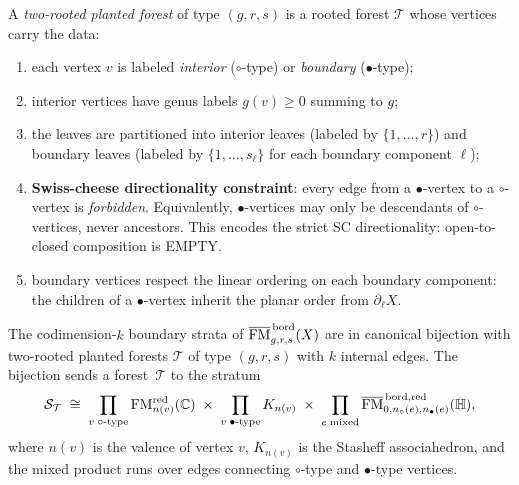 \begin{definition}
\label{def:two-rooted-forest}
A \emph{two-rooted planted forest} of type $(g,r,s)$ is a
rooted forest $\mathcal T$ whose vertices carry the data:
\begin{enumerate}[label=(\alph*)]
\item each vertex $v$ is labeled \emph{interior} ($\circ$-type) or
 \emph{boundary} ($\bullet$-type);
\item interior vertices have genus labels $g(v)\ge 0$ summing to
 $g$;
\item the leaves are partitioned into interior leaves (labeled by
 $\{1,\dotsc,r\}$) and boundary leaves (labeled by
 $\{1,\dotsc,s_\ell\}$ for each boundary component $\ell$);
\item \textbf{Swiss-cheese directionality constraint}:
 every edge from a $\bullet$-vertex to a $\circ$-vertex is
 \emph{forbidden}. Equivalently, $\bullet$-vertices may only
 be descendants of $\circ$-vertices, never ancestors.
 This encodes the strict SC directionality: open-to-closed
 composition is EMPTY.
\item boundary vertices respect the linear ordering on each
 boundary component: the children of a $\bullet$-vertex inherit the
 planar order from $\partial_\ell X$.
\end{enumerate}
\end{definition}

\begin{proposition}
\label{prop:bordered-stratification}
The codimension-$k$ boundary strata of
$\overline{\mathrm{FM}}^{\,\mathrm{bord}}_{g,r,s}(X)$ are in canonical
bijection with two-rooted planted forests $\mathcal T$ of type
$(g,r,s)$ with $k$ internal edges. The bijection sends a
forest~$\mathcal T$ to the stratum
\[
\mathcal S_{\mathcal T}
\;\cong\;
\prod_{v\;\circ\text{-type}}
\mathrm{FM}_{n(v)}^{\mathrm{red}}(\mathbb C)
\;\times\;
\prod_{v\;\bullet\text{-type}}
K_{n(v)}
\;\times\;
\prod_{e\;\mathrm{mixed}}
\overline{\mathrm{FM}}^{\,\mathrm{bord},\mathrm{red}}_{0,n_\circ(e),n_\bullet(e)}
(\mathbb H),
\]
where $n(v)$ is the valence of vertex $v$, $K_{n(v)}$ is the
Stasheff associahedron, and the mixed product runs over edges
connecting $\circ$-type and $\bullet$-type vertices.
\end{proposition}

